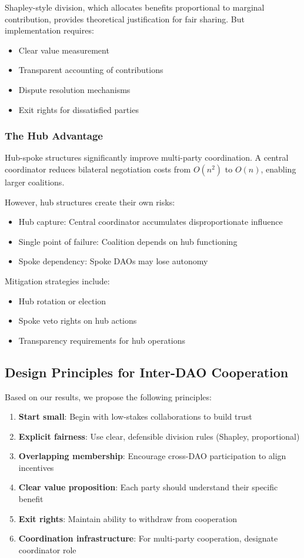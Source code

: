 Shapley-style division, which allocates benefits proportional to marginal contribution, provides theoretical justification for fair sharing. But implementation requires:
\begin{itemize}
    \item Clear value measurement
    \item Transparent accounting of contributions
    \item Dispute resolution mechanisms
    \item Exit rights for dissatisfied parties
\end{itemize}

\subsubsection{The Hub Advantage}

Hub-spoke structures significantly improve multi-party coordination. A central coordinator reduces bilateral negotiation costs from $O(n^2)$ to $O(n)$, enabling larger coalitions.

However, hub structures create their own risks:
\begin{itemize}
    \item Hub capture: Central coordinator accumulates disproportionate influence
    \item Single point of failure: Coalition depends on hub functioning
    \item Spoke dependency: Spoke DAOs may lose autonomy
\end{itemize}

Mitigation strategies include:
\begin{itemize}
    \item Hub rotation or election
    \item Spoke veto rights on hub actions
    \item Transparency requirements for hub operations
\end{itemize}

\subsection{Design Principles for Inter-DAO Cooperation}

Based on our results, we propose the following principles:

\begin{enumerate}
    \item \textbf{Start small}: Begin with low-stakes collaborations to build trust
    \item \textbf{Explicit fairness}: Use clear, defensible division rules (Shapley, proportional)
    \item \textbf{Overlapping membership}: Encourage cross-DAO participation to align incentives
    \item \textbf{Clear value proposition}: Each party should understand their specific benefit
    \item \textbf{Exit rights}: Maintain ability to withdraw from cooperation
    \item \textbf{Coordination infrastructure}: For multi-party cooperation, designate coordinator role
\end{enumerate}

